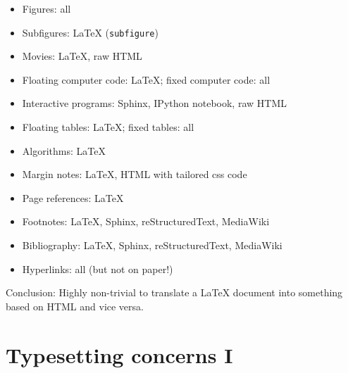 \documentclass[%
twoside,                 %
final,                   %
chapterprefix=true,      %
open=right               %
10pt]{book}
\begin{document}
\begin{itemize}
 \item Figures: all

 \item Subfigures: {\LaTeX} (\Verb!subfigure!)

 \item Movies: {\LaTeX}, raw HTML

 \item Floating computer code: {\LaTeX}; fixed computer code: all

 \item Interactive programs: Sphinx, IPython notebook, raw HTML

 \item Floating tables: {\LaTeX}; fixed tables: all

 \item Algorithms: {\LaTeX}

 \item Margin notes: {\LaTeX}, HTML with tailored css code

 \item Page references: {\LaTeX}

 \item Footnotes: {\LaTeX}, Sphinx, reStructuredText, MediaWiki

 \item Bibliography: {\LaTeX}, Sphinx, reStructuredText, MediaWiki

 \item Hyperlinks: all (but not on paper!)
\end{itemize}

\noindent

Conclusion: Highly non-trivial to translate a {\LaTeX} document into something
based on HTML and vice versa.

\section*{Typesetting concerns I}
\end{document}
